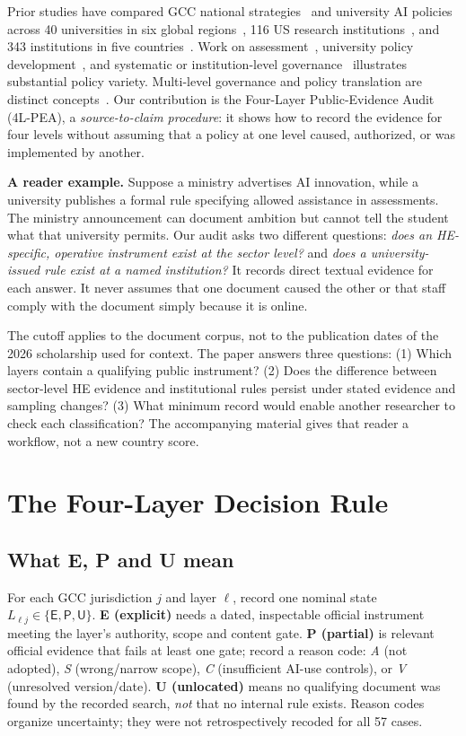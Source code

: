 \documentclass[conference,letterpaper]{IEEEtran}
\newcommand{\stE}{\textsf{E}}
\newcommand{\stP}{\textsf{P}}
\newcommand{\stU}{\textsf{U}}
\begin{document}
Prior studies have compared GCC national strategies~\cite{albous} and university AI policies across 40 universities in six global regions~\cite{jin}, 116 US research institutions~\cite{mcdonald}, and 343 institutions in five countries~\cite{parker}. Work on assessment~\cite{moorhouse}, university policy development~\cite{li}, and systematic or institution-level governance~\cite{jiang,khoza,an,bacalso,qian} illustrates substantial policy variety. Multi-level governance and policy translation are distinct concepts~\cite{vukasovic,donina}. Our contribution is the Four-Layer Public-Evidence Audit (4L-PEA), a \emph{source-to-claim procedure}: it shows how to record the evidence for four levels without assuming that a policy at one level caused, authorized, or was implemented by another.

\textbf{A reader example.} Suppose a ministry advertises AI innovation, while a university publishes a formal rule specifying allowed assistance in assessments. The ministry announcement can document ambition but cannot tell the student what that university permits. Our audit asks two different questions: \emph{does an HE-specific, operative instrument exist at the sector level?} and \emph{does a university-issued rule exist at a named institution?} It records direct textual evidence for each answer. It never assumes that one document caused the other or that staff comply with the document simply because it is online.

The cutoff applies to the document corpus, not to the publication dates of the 2026 scholarship used for context. The paper answers three questions: (1) Which layers contain a qualifying public instrument? (2) Does the difference between sector-level HE evidence and institutional rules persist under stated evidence and sampling changes? (3) What minimum record would enable another researcher to check each classification? The accompanying material gives that reader a workflow, not a new country score.

\section{The Four-Layer Decision Rule}
\subsection{What E, P and U mean}
For each GCC jurisdiction $j$ and layer $\ell$, record one nominal state $L_{\ell j}\in\{\stE,\stP,\stU\}$. \textbf{E (explicit)} needs a dated, inspectable official instrument meeting the layer's authority, scope and content gate. \textbf{P (partial)} is relevant official evidence that fails at least one gate; record a reason code: \emph{A} (not adopted), \emph{S} (wrong/narrow scope), \emph{C} (insufficient AI-use controls), or \emph{V} (unresolved version/date). \textbf{U (unlocated)} means no qualifying document was found by the recorded search, \emph{not} that no internal rule exists. Reason codes organize uncertainty; they were not retrospectively recoded for all 57 cases.
\end{document}
